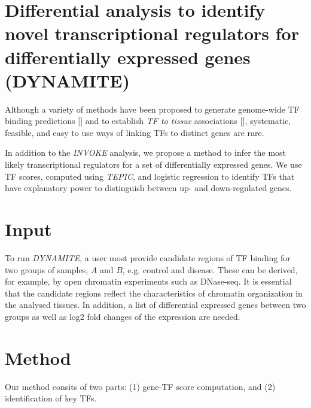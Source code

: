 \documentclass{article}
\begin{document}
\newpage
\section*{Differential analysis to identify novel transcriptional regulators for differentially expressed genes (DYNAMITE)}
Although a variety of methods have been proposed to generate genome-wide TF binding predictions [\cite{pmid27899623,pmid22072382,pmid23424114,pmid25086003}] and to establish \textit{TF to tissue} 
associations [\cite{pmid22955983,pmid19995984,pmid27899623}], systematic, feasible, and easy to use ways of linking TFs to distinct genes are rare. 

In addition to the \textit{INVOKE} analysis, we propose a method to infer the most likely transcriptional regulators for a set of differentially expressed genes. 
We use TF scores, computed using \textit{TEPIC}, and logistic regression to identify TFs that have explanatory power to distinguish between up- and down-regulated genes. 

\section*{Input}
To run \textit{DYNAMITE}, a user most provide candidate regions of TF binding for two groups of samples, $A$ and $B$, e.g. control and disease. 
These can be derived, for example, by open chromatin experiments such as DNase-seq. 
It is essential that the candidate regions reflect the characteristics of chromatin organization in the analysed tissues. 
In addition, a list of differential expressed genes between two groups as well as log2 fold changes of the expression are needed. 

\section*{Method}
Our method consits of two parts: (1) gene-TF score computation, and (2) identification of key TFs. 
\end{document}
